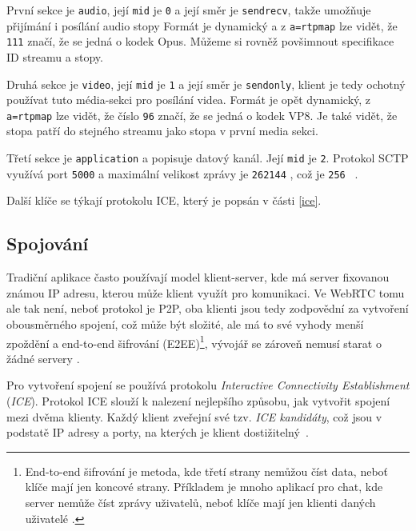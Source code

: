 První sekce je \texttt{audio}, její \texttt{mid} je
\texttt{0} a její směr je \texttt{sendrecv}, takže umožňuje
přijímání i posílání audio stopy Formát je dynamický a z
\texttt{a=rtpmap} lze vidět, že \texttt{111} značí, že se
jedná o kodek Opus. Můžeme si rovněž povšimnout specifikace ID streamu a stopy.

Druhá sekce je \texttt{video}, její \texttt{mid} je
\texttt{1} a její směr je \texttt{sendonly}, klient je tedy
ochotný používat tuto média-sekci pro posílání videa. Formát je opět dynamický,
z \texttt{a=rtpmap} lze vidět, že číslo \texttt{96} značí,
že se jedná o kodek VP8. Je také vidět, že stopa patří do stejného streamu jako
stopa v první media sekci.

Třetí sekce je \texttt{application} a popisuje datový kanál. Její
\texttt{mid} je \texttt{2}. Protokol SCTP využívá port
\texttt{5000} a maximální velikost zprávy je \texttt{262144}
\si{\byte}, což je \texttt{256} \si{\kibi\byte}.

Další klíče se týkají protokolu ICE, který je popsán v části \ref{ice}.

\subsection{Spojování}\label{connecting}

Tradiční aplikace často používají model klient-server, kde má server fixovanou
známou IP adresu, kterou může klient využít pro komunikaci. Ve WebRTC tomu ale
tak není, neboť protokol je P2P, oba klienti jsou tedy zodpovědní za vytvoření
obousměrného spojení, což může být složité, ale má to své vyhody menší zpoždění
a end-to-end šifrování (E2EE)\footnote{End-to-end šifrování je metoda, kde
třetí strany nemůžou číst data, neboť klíče mají jen koncové strany. Příkladem
je mnoho aplikací pro chat, kde server nemůže číst zprávy uživatelů, neboť klíče
mají jen klienti daných uživatelé \cite{IBM-EndToEndEncryption}.}, vývojář se
zároveň nemusí starat o žádné servery \cite{WebRTCForTheCurious}.

Pro vytvoření spojení se používá protokolu \textit{Interactive Connectivity
	Establishment} (\textit{ICE}). Protokol ICE slouží k nalezení nejlepšího
způsobu, jak vytvořit spojení mezi dvěma klienty. Každý klient zveřejní své
tzv. \textit{ICE kandidáty}, což jsou v podstatě IP adresy a porty, na
kterých je klient dostižitelný~\cite{WebRTCForTheCurious}.

